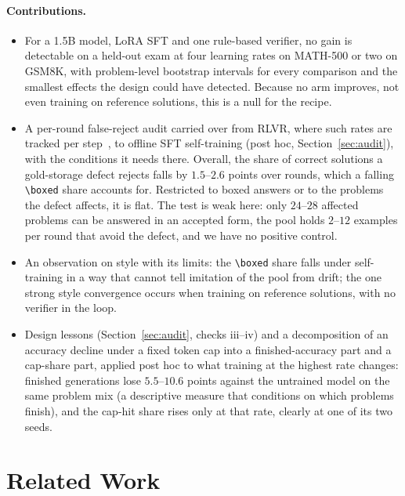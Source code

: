 \documentclass[runningheads]{llncs}
\begin{document}
\paragraph{Contributions.}
\begin{itemize}
\item For a 1.5B model, LoRA SFT and one rule-based verifier, no gain is
detectable on a held-out exam at four learning rates on MATH-500 or two on
GSM8K, with problem-level bootstrap intervals for every comparison and the
smallest effects the design could have detected. Because no arm improves,
not even training on reference solutions, this is a null for the recipe.
\item A per-round false-reject audit carried over from RLVR, where such rates
are tracked per step~\cite{ref_delayplateau,ref_tinyv}, to offline SFT
self-training (post hoc, Section~\ref{sec:audit}), with the conditions it
needs there. Overall, the share of correct solutions a gold-storage defect
rejects falls by $1.5$--$2.6$ points over rounds, which a falling
\verb|\boxed| share accounts for. Restricted to boxed answers or to the
problems the defect affects, it is flat. The test is weak here: only $24$--$28$
affected problems can be answered in an accepted form, the pool holds $2$--$12$
examples per round that avoid the defect, and we have no positive control.
\item An observation on style with its limits: the \verb|\boxed| share falls
under self-training in a way that cannot tell imitation of the pool from drift;
the one strong style convergence occurs when training on reference solutions,
with no verifier in the loop.
\item Design lessons (Section~\ref{sec:audit}, checks iii--iv) and a decomposition of an accuracy decline under a fixed token cap into a
finished-accuracy part and a cap-share part, applied post hoc to what training
at the highest rate changes: finished generations lose $5.5$--$10.6$ points
against the untrained model on the same problem mix (a descriptive measure
that conditions on which problems finish), and the cap-hit share rises only
at that rate, clearly at one of its two seeds.
\end{itemize}

\section{Related Work}
\label{sec:related}
\end{document}
